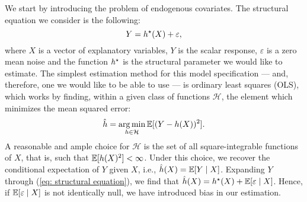 We start by introducing the problem of endogenous covariates.
The structural equation we consider is the following:
\begin{equation}
    \label{eq: structural equation}
    Y = h^{ \star } ( X ) + \varepsilon
,\end{equation}
where $ X $ is a vector of explanatory variables, $ Y $ is the scalar response, $ \varepsilon $ is a zero mean noise and the function $ h^{ \star } $ is the structural parameter we would like to estimate.
The simplest estimation method for this model specification --- and, therefore, one we would like to be able to use --- is ordinary least squares (OLS), which works by finding, within a given class of functions $ \mathcal{H} $, the element which minimizes the mean squared error:
\begin{equation}
    \label{eq: ols estimate}
    \hat{ h } = \operatorname*{arg\,min}_{ h \in \mathcal{H} } \mathbb{E} [ 
        ( Y - h ( X ) )^2
    ]
.\end{equation}
A reasonable and ample choice for $ \mathcal{H} $ is the set of all square-integrable functions of $ X $, that is, such that $ \mathbb{E} [ h ( X )^2 ] < \infty $.
Under this choice, we recover the conditional expectation of $ Y $ given $ X $, i.e., $ \hat{ h } ( X ) = \mathbb{E} [ Y \mid X ] $.
Expanding $ Y $ through (\ref{eq: structural equation}), we find that $ \hat{ h } ( X ) = h^{ \star } ( X ) + \mathbb{E} [ \varepsilon \mid X ] $.
Hence, if $ \mathbb{E} [ \varepsilon \mid X ] $ is not identically null, we have introduced bias in our estimation.

